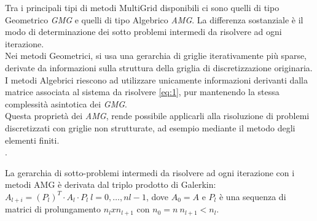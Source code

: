 Tra i principali tipi di metodi MultiGrid disponibili ci sono quelli di tipo Geometrico \emph{GMG} e quelli di tipo Algebrico \emph{AMG}.
La differenza sostanziale è il modo di determinazione dei sotto problemi intermedi da risolvere ad ogni iterazione.\\
Nei metodi Geometrici, si usa una gerarchia di griglie iterativamente più sparse,%
derivate da informazioni sulla struttura della griglia di discretizzazione originaria.\\
I metodi Algebrici riescono ad utilizzare unicamente informazioni derivanti dalla matrice associata al sistema da risolvere \ref{eq:1},
pur mantenendo la stessa complessità asintotica dei \emph{GMG}.\\
Questa proprietà dei \emph{AMG}, rende possibile applicarli 
alla risoluzione di problemi discretizzati con griglie non strutturate,
ad esempio mediante il metodo degli elementi finiti.\\
\cite{AMGgeneralANY}.\\
\par\null\par	%
La gerarchia di sotto-problemi intermedi da risolvere ad ogni iterazione con i metodi AMG è derivata dal triplo prodotto di Galerkin:\\
$A_{l+i} = (P_l)^T \cdot A_l \cdot P_l~l=0,\dots,nl-1$, dove $A_0 = A$ \cite{amgProf}
e $P_l$ è una sequenza di matrici di prolungamento $n_l x n_{l+1}$ con $n_0=n~n_{l+1}<n_l$.\\
\par\null\par
